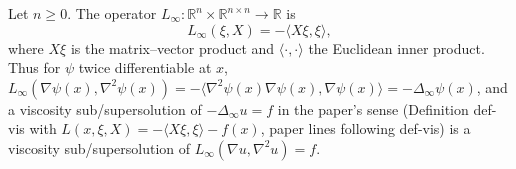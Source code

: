 \begin{definition}
Let $n\ge0$. The operator $L_\infty:\mathbb R^n\times\mathbb R^{n\times n}\to\mathbb R$ is
\[
L_\infty(\xi,X)=-\langle X\xi,\xi\rangle ,
\]
where $X\xi$ is the matrix--vector product and $\langle\cdot,\cdot\rangle$ the Euclidean inner product. Thus for $\psi$ twice differentiable at $x$, $L_\infty(\nabla\psi(x),\nabla^2\psi(x))=-\langle\nabla^2\psi(x)\nabla\psi(x),\nabla\psi(x)\rangle=-\Delta_\infty\psi(x)$, and a viscosity sub/supersolution of $-\Delta_\infty u=f$ in the paper's sense (Definition def-vis with $L(x,\xi,X)=-\langle X\xi,\xi\rangle-f(x)$, paper lines following def-vis) is a viscosity sub/supersolution of $L_\infty(\nabla u,\nabla^2u)=f$.
\end{definition}
